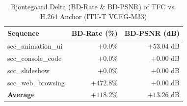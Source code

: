 \begin{table}[t]
\centering
\caption{Bjontegaard Delta (BD-Rate & BD-PSNR) of TFC vs. H.264 Anchor (ITU-T VCEG-M33)}
\label{tab:scc_bd_rates}
\begin{tabular}{lrr}
\toprule
\textbf{Sequence} & \textbf{BD-Rate (\%)} & \textbf{BD-PSNR (dB)} \\
\midrule
scc\_animation\_ui & $\mathbf{+0.0\%}$ & $\mathbf{+53.04}$ dB \\
scc\_console\_code & $\mathbf{+0.0\%}$ & $\mathbf{+0.00}$ dB \\
scc\_slideshow & $\mathbf{+0.0\%}$ & $\mathbf{+0.00}$ dB \\
scc\_web\_browsing & $\mathbf{+472.8\%}$ & $\mathbf{+0.00}$ dB \\
\midrule
\textbf{Average} & $\mathbf{+118.2\%}$ & $\mathbf{+13.26}$ dB \\
\bottomrule
\end{tabular}
\end{table}